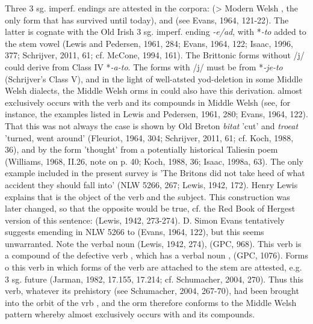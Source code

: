 Three 3 sg. imperf. endings are attested in the corpora:  (> Modern Welsh , the only form that has survived until today),  and  (see Evans, 1964, 121-22). The latter is cognate with the Old Irish 3 sg. imperf. ending \textit{-e/ad}, with *\textit{-to} added to the stem vowel (Lewis and Pedersen, 1961, 284; Evans, 1964, 122; Isaac, 1996, 377; Schrijver, 2011, 61; cf. McCone, 1994, 161). The Brittonic forms without /j/ could derive from Class IV *\textit{-a-to}. The forms with /j/ must be from *\textit{-je-to} (Schrijver's Class V), and in the light of well-atsted yod-deletion in some Middle Welsh dialects, the Middle Welsh orms in  could also have this derivation.  almost exclusively occurs with the verb  and its compounds in Middle Welsh (see, for instance, the examples listed in Lewis and Pedersen, 1961, 280; Evans, 1964, 122). That this was not always the case is shown by Old Breton \textit{bitat} 'cut' and \textit{troeat} 'turned, went around' (Fleuriot, 1964, 304; Schrijver, 2011, 61; cf. Koch, 1988, 36), and by the form  'thought' from a potentially historical Taliesin poem (Williams, 1968, II.26, note on p. 40; Koch, 1988, 36; Isaac, 1998a, 63). The only example included in the present survey is  'The Britons did not take heed of what accident they should fall into' (NLW 5266, 267; Lewis, 1942, 172). Henry Lewis explains that  is the object of the verb and  the subject. This construction was later changed, so that the opposite would be true, cf. the Red Book of Hergest version of this sentence: (Lewis, 1942, 273-274). D. Simon Evans tentatively suggests emending  in NLW 5266 to  (Evans, 1964, 122), but this seems unwarranted. Note the verbal noun  (Lewis, 1942, 274),  (GPC, 968). This verb is a compound of the defective verb , which has a verbal noun ,  (GPC, 1076). Forms o this verb in which forms of the verb  are attached to the stem  are attested, e.g. 3 sg. future  (Jarman, 1982, 17.155, 17.214; cf. Schumacher, 2004, 270). Thus this verb, whatever its prehistory (see Schumacher, 2004, 267-70), had been brought into the orbit of the vrb , and the orm  therefore conforms to the Middle Welsh pattern whereby  almost exclusively occurs with  and its compounds.

